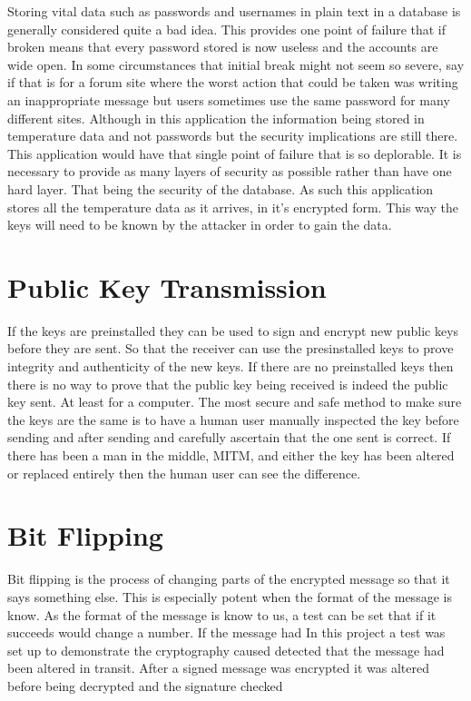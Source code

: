 Storing vital data such as passwords and usernames in plain text in a database is generally considered quite a bad idea. This provides one point of failure that if broken means that every password stored is now useless and the accounts are wide open. In some circumstances that initial break might not seem so severe, say if that is for a forum site where the worst action that could be taken was writing an inappropriate message but users sometimes use the same password for many different sites. Although in this application the information being stored in temperature data and not passwords but the security implications are still there. This application would have that single point of failure that is so deplorable. It is necessary to provide as many layers of security as possible rather than have one hard layer. That being the security of the database. As such this application stores all the temperature data as it arrives, in it's encrypted form. This way the keys will need to be known by the attacker in order to gain the data.

\section{Public Key Transmission}

If the keys are preinstalled they can be used to sign and encrypt new public keys before they are sent. So that the receiver can use the presinstalled keys to prove integrity and authenticity of the new keys. If there are no preinstalled keys then there is no way to prove that the public key being received is indeed the public key sent. At least for a computer. The most secure and safe method to make sure the keys are the same is to have a human user manually inspected the key before sending and after sending and carefully ascertain that the one sent is correct. If there has been a man in the middle, MITM, and either the key has been altered or replaced entirely then the human user can see the difference. 

\section{Bit Flipping}

Bit flipping is the process of changing parts of the encrypted message so that it says something else. This is especially potent when the format of the message is know. As the format of the message is know to us, a test can be set that if it succeeds would change a number. If the message had 
In this project a test was set up to demonstrate the cryptography caused detected that the message had been altered in transit.
After a signed message was encrypted it was altered before being decrypted and the signature checked

